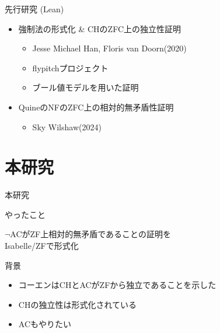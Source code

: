 \documentclass[17pt,aspectratio=169]{beamer}
\begin{document}
\begin{frame}{先行研究 (Lean)}
    \vspace{10pt}

    \begin{itemize}
        \item 強制法の形式化 \& CHのZFC上の独立性証明
              {\small \begin{itemize}
                  \item Jesse Michael Han, Floris van Doorn(2020)
                  \item flypitchプロジェクト
                  \item ブール値モデルを用いた証明
              \end{itemize} }

        \item QuineのNFのZFC上の相対的無矛盾性証明
              {\small \begin{itemize}
                  \item Sky Wilshaw(2024)
              \end{itemize} }

    \end{itemize}
\end{frame}

\section{本研究}

\begin{frame}{本研究}
    \begin{itembox}[l]{やったこと}
        \begin{center}
            $\neg$ACがZF上相対的無矛盾であることの証明を\\Isabelle/ZFで形式化
        \end{center}
    \end{itembox}

    背景
    \vspace{-10pt}
    {\small
        \begin{itemize}
            \setlength{\itemsep}{1pt}
            \item コーエンはCHとACがZFから独立であることを示した
            \item CHの独立性は形式化されている
            \item ACもやりたい
        \end{itemize}

    }
\end{frame}
\end{document}
